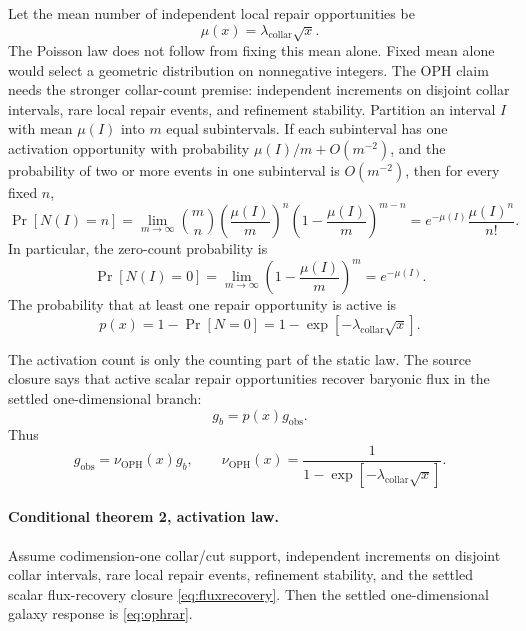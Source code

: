\documentclass[11pt]{article}
\newcommand{\OPH}{\mathrm{OPH}}
\newcommand{\lambdac}{\lambda_{\mathrm{collar}}}
\begin{document}
Let the mean number of independent local repair opportunities be
\begin{equation}
  \mu(x)=\lambdac\sqrt{x}.
\end{equation}
The Poisson law does not follow from fixing this mean alone.
Fixed mean alone would select a geometric distribution on nonnegative
integers.  The OPH claim needs the stronger collar-count premise: independent
increments on disjoint collar intervals, rare local repair events, and
refinement stability.  Partition an interval \(I\) with mean \(\mu(I)\) into
\(m\) equal subintervals.  If each subinterval has one activation opportunity
with probability \(\mu(I)/m+O(m^{-2})\), and the probability of two or more
events in one subinterval is \(O(m^{-2})\), then for every fixed \(n\),
\begin{equation}
  \Pr[N(I)=n]
  =
  \lim_{m\to\infty}
  {m\choose n}
  \left(\frac{\mu(I)}{m}\right)^n
  \left(1-\frac{\mu(I)}{m}\right)^{m-n}
  =
  e^{-\mu(I)}\frac{\mu(I)^n}{n!}.
  \label{eq:poissonlaw}
\end{equation}
In particular, the zero-count probability is
\begin{equation}
  \Pr[N(I)=0]
  =
  \lim_{m\to\infty}
  \left(1-\frac{\mu(I)}{m}\right)^m
  =
  e^{-\mu(I)}.
\end{equation}
The probability that at least one repair opportunity is active is
\begin{equation}
  p(x)=1-\Pr[N=0]
      =1-\exp[-\lambdac\sqrt{x}].
  \label{eq:activation}
\end{equation}

The activation count is only the counting part of the static law.  The source
closure says that active scalar repair opportunities recover baryonic flux in
the settled one-dimensional branch:
\begin{equation}
  g_b = p(x) g_{\mathrm{obs}}.
  \label{eq:fluxrecovery}
\end{equation}
Thus
\begin{equation}
  g_{\mathrm{obs}}
    = \nu_{\OPH}(x) g_b,
  \qquad
  \nu_{\OPH}(x)
    = \frac{1}{1-\exp[-\lambdac\sqrt{x}]}.
  \label{eq:ophrar}
\end{equation}

\paragraph{Conditional theorem 2, activation law.}
Assume codimension-one collar/cut support, independent increments on disjoint
collar intervals, rare local repair events, refinement stability, and the
settled scalar flux-recovery closure \eqref{eq:fluxrecovery}.  Then the
settled one-dimensional galaxy response is \eqref{eq:ophrar}.
\end{document}
